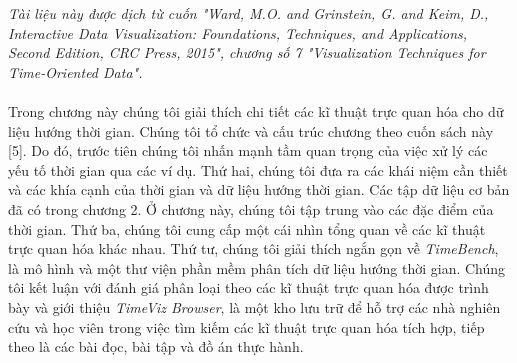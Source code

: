\textit{Tài liệu này được dịch từ cuốn "Ward, M.O. and Grinstein, G. and Keim, D.,  Interactive Data Visualization: Foundations, Techniques, and Applications, Second Edition, CRC Press, 2015", chương số 7 "Visualization Techniques for Time-Oriented Data".}
\\ \\
Trong chương này chúng tôi giải thích chi tiết các kĩ thuật trực quan hóa cho dữ liệu hướng thời gian. Chúng tôi tổ chức và cấu trúc chương theo cuốn sách này [5]. Do đó, trước tiên chúng tôi nhấn mạnh tầm quan trọng của việc xử lý các yếu tố thời gian qua các ví dụ. Thứ hai, chúng tôi đưa ra các khái niệm cần thiết và các khía cạnh của thời gian và dữ liệu hướng thời gian. Các tập dữ liệu cơ bản đã có trong chương 2. Ở chương này, chúng tôi tập trung vào các đặc điểm của thời gian. Thứ ba, chúng tôi cung cấp một cái nhìn tổng quan về các kĩ thuật trực quan hóa khác nhau. Thứ tư, chúng tôi giải thích ngắn gọn về  \textit{TimeBench}, là mô hình và một thư viện phần mềm phân tích dữ liệu hướng thời gian. Chúng tôi kết luận với đánh giá phân loại theo các kĩ thuật trực quan hóa được trình bày và giới thiệu \textit{TimeViz Browser}, là một kho lưu trữ để hỗ trợ các nhà nghiên cứu và học viên trong việc tìm kiếm các kĩ thuật trực quan hóa tích hợp, tiếp theo là các bài đọc, bài tập và đồ án thực hành.